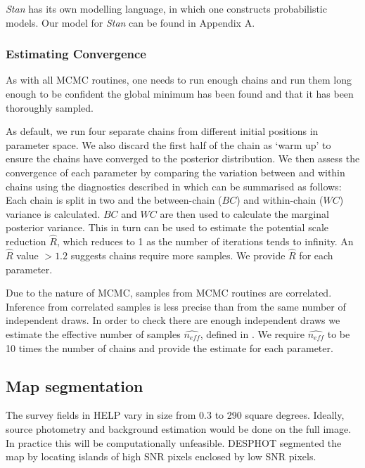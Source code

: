 \documentclass[useAMS,usenatbib]{mnras}
\begin{document}
\textit{Stan} has its own modelling language, in which one constructs probabilistic models. Our model for \textit{Stan} can be found in Appendix A.
\subsubsection{Estimating Convergence}\label{sec:conv}
As with all MCMC routines, one needs to run enough chains and run them long enough to be confident the global minimum has been found and that it has been thoroughly sampled. 

As default, we run four separate chains from different initial positions in parameter space. We also discard the first half of the chain as `warm up' to ensure the chains have converged to the posterior distribution. We then assess the convergence of each parameter by comparing the variation between and within chains using the diagnostics described in \cite{BDA3} which can be summarised as follows: Each chain is split in two and the between-chain ($BC$) and within-chain ($WC$) variance is calculated. $BC$ and $WC$ are then used to calculate the marginal posterior variance. This in turn can be used to estimate the potential scale reduction $\hat{R}$, which reduces to 1 as the number of iterations tends to infinity. An $\hat{R}$ value $> 1.2$ suggests chains require more samples. We provide $\hat{R}$ for each parameter.

Due to the nature of MCMC, samples from MCMC routines are correlated. Inference from correlated samples is less precise than from the same number of independent draws. In order to check there are enough independent draws we estimate the effective number of samples $\hat{n_{eff}}$, defined in \cite{BDA3}. We require $\hat{n_{eff}}$ to be 10 times the number of chains and provide the estimate for each parameter.

\subsection{Map segmentation}
The survey fields in HELP vary in size from 0.3 to 290 square degrees. Ideally, source photometry and background estimation would be done on the full image. In practice this will be computationally unfeasible. \textsc{DESPHOT} segmented the map by locating islands of high SNR pixels enclosed by low SNR pixels.
\end{document}
